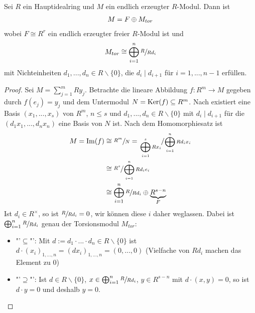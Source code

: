 \begin{theorem}
	Sei $R$ ein Hauptidealring und $M$ ein endlich erzeugter $R$-Modul. Dann ist
	\begin{align}
		M = F\oplus M_{tor}\notag
	\end{align}
	wobei $F\cong R^r$ ein endlich erzeugter freier $R$-Modul ist und
	\begin{align}
		M_{tor} \cong \bigoplus_{i=1}^n \sfrac{R}{Rd_i}\notag
	\end{align}
	mit Nichteinheiten $d_1,...,d_n\in R\backslash\{0\}$, die $d_i\mid d_{i+1}$ für $i=1,...,n-1$ erfüllen.
\end{theorem}
\begin{proof}
	Sei $M=\sum_{j=1}^m Ry_j$. Betrachte die lineare Abbildung $f:R^m\to M$ gegeben durch $f(e_j)=y_j$ und dem Untermodul $N=\operatorname{Ker}(f)\subseteq R^m$. Nach  existiert eine Basis $(x_1,...,x_s)$ von $R^m$, $n\le s$ und $d_1,...,d_n\in R\backslash\{0\}$ mit $d_i\mid d_{i+1}$ für die $(d_1x_1,...,d_nx_n)$ eine Basis von $N$ ist. Nach dem Homomorphiesatz ist
	\begin{align}
		M=\operatorname{Im}(f)&\cong\sfrac{R^m}{N}=\sfrac{\bigoplus_{i=1}^s Rx_i}{\bigoplus_{i=1}^n Rd_ix_i} \notag \\
		&\cong \sfrac{R^s}{\bigoplus_{i=1}^n Rd_ie_i}\notag \\
		&\cong \bigoplus_{i=1}^n \sfrac{R}{Rd_i}\oplus \underbrace{R^{s-n}}_{F}\notag
	\end{align}
	Ist $d_i\in R^\times$, so ist $\sfrac{R}{Rd_i}=0$, wir können diese $i$ daher weglassen. Dabei ist $\bigoplus_{i=1}^n \sfrac{R}{Rd_i}$ genau der Torsionsmodul $M_{tor}$:
	\begin{itemize}
		\item "'$\subseteq$"': Mit $d:=d_1\cdot ... \cdot d_n\in R\backslash\{0\}$ ist $d\cdot (x_i)_{1,...,n}=(dx_i)_{1,...,n}=(0,...,0)$ (Vielfache von $Rd_i$ machen das Element zu 0)
		\item "'$\supseteq$"': Ist $d\in R\backslash\{0\}$, $x\in\bigoplus_{i=1}^n\sfrac{R}{Rd_i}$, $y\in R^{s-n}$ mit $d\cdot (x,y)=0$, so ist $d\cdot y=0$ und deshalb $y=0$.
	\end{itemize}
\end{proof}